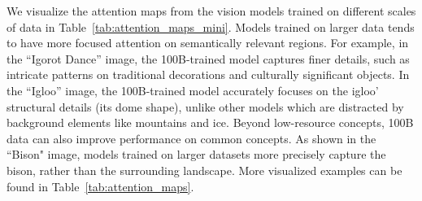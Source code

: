 We visualize the attention maps from the vision models trained on different scales of data in Table~\ref{tab:attention_maps_mini}. Models trained on larger data tends to have more focused attention on semantically relevant regions.
For example, in the ``Igorot Dance'' image, the 100B-trained model captures finer details, such as intricate patterns on traditional decorations and culturally significant objects.
In the ``Igloo'' image, the 100B-trained model accurately focuses on the igloo' structural details (its dome shape), unlike other models which are distracted by background elements like mountains and ice.
Beyond low-resource concepts, 100B data can also improve performance on common concepts. As shown in the ``Bison" image, models trained on larger datasets more precisely capture the bison, rather than the surrounding landscape.
More visualized examples can be found in Table~\ref{tab:attention_maps}.


